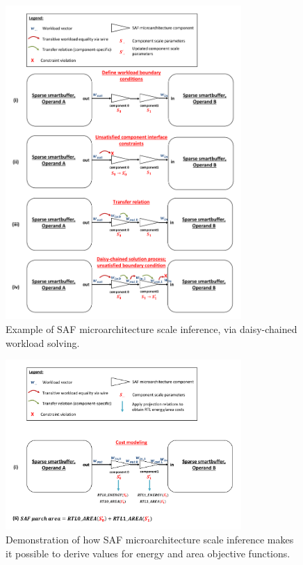 \begin{itemize}
\begin{figure}[ht]
    \centering
    \includegraphics[width=0.8\textwidth]{figures/workload_example.pdf}
    \caption{Example of SAF microarchitecture scale inference, via daisy-chained workload solving.}
    \label{fig:workload_example}
\end{figure}

\begin{figure}[ht]
    \centering
    \includegraphics[width=0.8\textwidth]{figures/rtl_objective.pdf}
    \caption{Demonstration of how SAF microarchitecture scale inference makes it possible to derive values for energy and area objective functions.}
    \label{fig:rtl_objective}
\end{figure}


\end{itemize}
